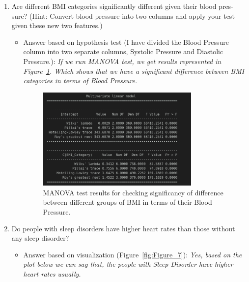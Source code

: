 \documentclass{article}
\begin{document}
\begin{enumerate}
\begin{enumerate}[label=(\alph*)]
        \item Are different BMI categories significantly different given their blood pres-
        sure? (Hint: Convert blood pressure into two columns and apply your
        test given these new two features.)
        \begin{itemize}
            \item Answer based on hypothesis test (I have divided the Blood Pressure \\ 
            column into two separate columns, Systolic Pressure and Diastolic Pressure.):
            \textit{If we run MANOVA test, we get results represented in Figure~\ref{fig:Figure_6}. Which shows that we have a significant difference between BMI categories in terms of Blood Pressure.}
            
            \begin{figure}[H]  %

                \centering
                \includegraphics[width=0.8\textwidth]{./images/health_manova_test_for_bp.png}  %
                \caption{MANOVA test results for checking significancy of difference between different groups of BMI in terms of their Blood Pressure.}
                \label{fig:Figure_6}  %
    
            \end{figure}

        \end{itemize}

        \item Do people with sleep disorders have higher heart rates than those without
        any sleep disorder?
        \begin{itemize}
            \item Answer based on visualization (Figure~\ref{fig:Figure_7}):
            \textit{Yes, based on the plot below we can say that, the people with Sleep Disorder have higher heart rates usually.}
            

\end{itemize}
\end{enumerate}
\end{enumerate}
\end{document}

